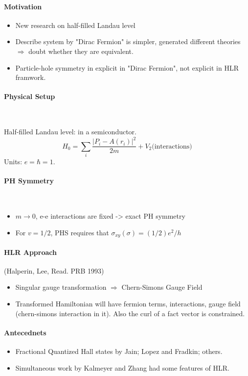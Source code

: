 \documentclass{article}
\numberwithin{equation}{subsection} %
\theoremstyle{definition}
\begin{document}
\paragraph{Motivation}
\begin{itemize}
    \item New research on half-filled Landau level
    \item Describe system by "Dirac Fermion" is simpler, generated
        different theories $\Rightarrow$ doubt whether they are
        equivalent.
    \item Particle-hole symmetry in explicit in "Dirac Fermion", not
        explicit in HLR framwork.
\end{itemize}
\paragraph{Physical Setup} $ $

Half-filled Landau level: in a semiconductor.
$$ H_0 = \sum_i \frac{ |P_i - A(r_i)|^2}{2m} + V_2 \text{(interactions)}
$$
Units: $e=\hbar=1$.
\paragraph{PH Symmetry} $ $

\begin{itemize}
    \item $m\to 0$, e-e interactions are fixed -> exact PH symmetry
    \item For $v=1/2$, PHS requires that $\sigma_{xy}(\sigma)=(1/2) e^2/h$
\end{itemize}

\paragraph{HLR Approach}
(Halperin, Lee, Read. PRB 1993)

\begin{itemize}
    \item Singular gauge transformation $\Rightarrow$ Chern-Simons Gauge
        Field
    \item Transformed Hamiltonian will have fermion terms, interactions,
        gauge field (chern-simons interaction in it). Also the curl of a
        fact vector is constrained.
\end{itemize}
\paragraph{Antecednets}
\begin{itemize}
    \item Fractional Quantized Hall states by Jain; Lopez and Fradkin;
        others.
    \item Simultaneous work by Kalmeyer and Zhang had some features of
        HLR.
\end{itemize}
\end{document}
